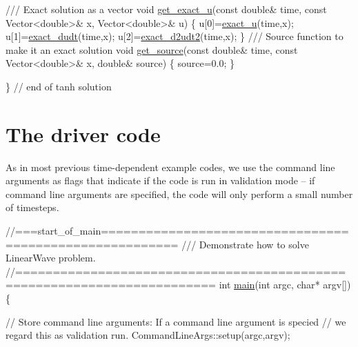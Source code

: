 \begin{DoxyCodeInclude}
\textcolor{comment}{}
\textcolor{comment}{ /// Exact solution as a vector}
\textcolor{comment}{} \textcolor{keywordtype}{void} \hyperlink{namespaceTanhSolnForLinearWave_a7dd7e9f155d19f871ba87d3fe41fd8e9}{get\_exact\_u}(\textcolor{keyword}{const} \textcolor{keywordtype}{double}& time, \textcolor{keyword}{const} Vector<double>& x, 
                  Vector<double>& u)
 \{
  u[0]=\hyperlink{namespaceTanhSolnForLinearWave_aceea2935b2d3815ce72aae8c9de2b468}{exact\_u}(time,x);
  u[1]=\hyperlink{namespaceTanhSolnForLinearWave_aa2081bd3d3d518a38497f664b0e498bc}{exact\_dudt}(time,x);
  u[2]=\hyperlink{namespaceTanhSolnForLinearWave_a63b7a0f5fd5d06cc2c0a43322a81fe43}{exact\_d2udt2}(time,x);
 \}
\textcolor{comment}{}
\textcolor{comment}{ /// Source function to make it an exact solution }
\textcolor{comment}{} \textcolor{keywordtype}{void} \hyperlink{namespaceTanhSolnForLinearWave_a3bc9643b40e62283dc09f405ed17c805}{get\_source}(\textcolor{keyword}{const} \textcolor{keywordtype}{double}& time, \textcolor{keyword}{const} Vector<double>& x, \textcolor{keywordtype}{double}& source)
 \{
  source=0.0;
 \}

\} \textcolor{comment}{// end of tanh solution}

\end{DoxyCodeInclude}




 

\hypertarget{index_main}{}\section{The driver code}\label{index_main}
As in most previous time-\/dependent example codes, we use the command line arguments as flags that indicate if the code is run in validation mode -- if command line arguments are specified, the code will only perform a small number of timesteps.


\begin{DoxyCodeInclude}
\textcolor{comment}{//===start\_of\_main========================================================}
\textcolor{comment}{/// Demonstrate how to solve LinearWave problem.}
\textcolor{comment}{}\textcolor{comment}{//========================================================================}
\textcolor{keywordtype}{int} \hyperlink{two__d__linear__wave_8cc_a0ddf1224851353fc92bfbff6f499fa97}{main}(\textcolor{keywordtype}{int} argc, \textcolor{keywordtype}{char}* argv[])
\{

 \textcolor{comment}{// Store command line arguments: If a command line argument is specied}
 \textcolor{comment}{// we regard this as validation run.}
 CommandLineArgs::setup(argc,argv);

\end{DoxyCodeInclude}


